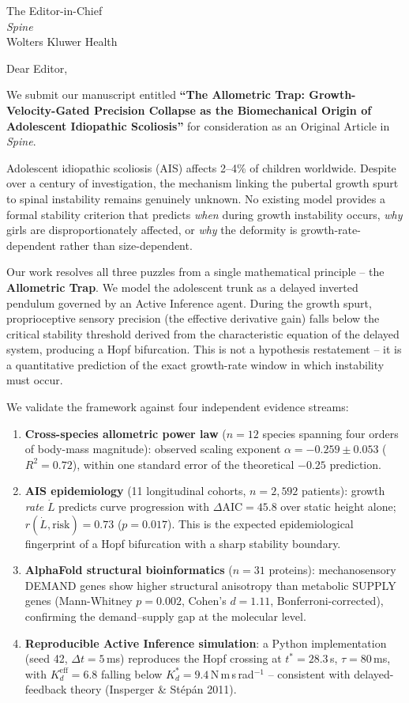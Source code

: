 \documentclass[12pt]{letter}
\begin{document}
\begin{letter}{The Editor-in-Chief\\\textit{Spine}\\Wolters Kluwer Health}

\opening{Dear Editor,}

We submit our manuscript entitled \textbf{``The Allometric Trap:
Growth-Velocity-Gated Precision Collapse as the Biomechanical Origin of
Adolescent Idiopathic Scoliosis''} for consideration as an Original Article
in \textit{Spine}.

Adolescent idiopathic scoliosis (AIS) affects 2--4\% of children worldwide.
Despite over a century of investigation, the mechanism linking the pubertal
growth spurt to spinal instability remains genuinely unknown. No existing
model provides a formal stability criterion that predicts \emph{when} during
growth instability occurs, \emph{why} girls are disproportionately affected,
or \emph{why} the deformity is growth-rate-dependent rather than size-dependent.

Our work resolves all three puzzles from a single mathematical principle -- the
\textbf{Allometric Trap}. We model the adolescent trunk as a delayed inverted
pendulum governed by an Active Inference agent. During the growth spurt,
proprioceptive sensory precision (the effective derivative gain) falls below
the critical stability threshold derived from the characteristic equation of
the delayed system, producing a Hopf bifurcation. This is not a hypothesis
restatement -- it is a quantitative prediction of the exact growth-rate window
in which instability must occur.

We validate the framework against four independent evidence streams:
\begin{enumerate}
  \item \textbf{Cross-species allometric power law} ($n=12$ species spanning
    four orders of body-mass magnitude): observed scaling exponent
    $\alpha = -0.259 \pm 0.053$ ($R^{2} = 0.72$), within one standard error
    of the theoretical $-0.25$ prediction.
  \item \textbf{AIS epidemiology} (11 longitudinal cohorts, $n=2{,}592$
    patients): growth \emph{rate} $\dot{L}$ predicts curve progression with
    $\Delta\text{AIC} = 45.8$ over static height alone; $r(\dot{L},
    \text{risk}) = 0.73$ ($p = 0.017$). This is the expected epidemiological
    fingerprint of a Hopf bifurcation with a sharp stability boundary.
  \item \textbf{AlphaFold structural bioinformatics} ($n=31$ proteins):
    mechanosensory DEMAND genes show higher structural anisotropy than
    metabolic SUPPLY genes (Mann-Whitney $p = 0.002$, Cohen's $d = 1.11$,
    Bonferroni-corrected), confirming the demand--supply gap at the molecular
    level.
  \item \textbf{Reproducible Active Inference simulation}: a Python
    implementation (seed 42, $\Delta t = 5$\,ms) reproduces the Hopf crossing
    at $t^{*} = 28.3$\,s, $\tau = 80$\,ms, with $K_d^\text{eff} = 6.8$
    falling below $K_d^* = 9.4$\,N\,m\,s\,rad$^{-1}$ -- consistent with
    delayed-feedback theory (Insperger \& St\'{e}p\'{a}n 2011).
\end{enumerate}


\end{letter}
\end{document}
